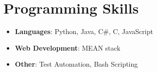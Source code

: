 \documentclass[letterpaper,11pt]{article}
\newcommand{\resumeItem}[2]{
  \item\small{
    \textbf{#1}{: #2 \vspace{-2pt}}
  }
}
\newcommand{\resumeSubHeadingListStart}{\begin{itemize}[leftmargin=*]}
\newcommand{\resumeSubHeadingListEnd}{\end{itemize}}
\newcommand{\resumeItemListStart}{\begin{itemize}}
\newcommand{\resumeItemListEnd}{\end{itemize}\vspace{-5pt}}
\begin{document}
\section{Programming Skills}
  \resumeSubHeadingListStart
    \item
      \textbf{Languages}{: Python, Java, C\#, C, JavaScript } 
    \item 
      \textbf{Web Development}{: MEAN stack }
      \item \textbf{Other}{: Test Automation, Bash Scripting}
  \resumeSubHeadingListEnd 
  


\end{document}
